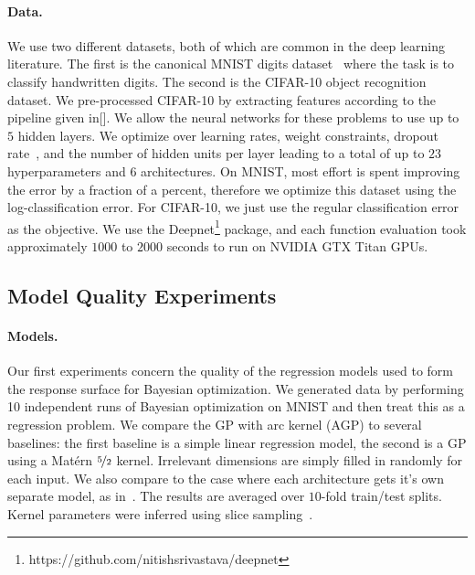 \documentclass{article}
\begin{document}
\paragraph{Data.} We use two different datasets, both of which are common in the deep learning literature. The first is the canonical MNIST digits dataset~\cite{lecun-1998a} where the task is to classify handwritten digits. The second is the CIFAR-10 object recognition dataset. We pre-processed CIFAR-10 by extracting features according to the pipeline given in[]. We allow the neural networks for these problems to use up to $5$ hidden layers. We optimize over learning rates, weight constraints, dropout rate~\cite{hinton2012improving}, and the number of hidden units per layer leading to a total of up to $23$ hyperparameters and $6$ architectures. On MNIST, most effort is spent improving the error by a fraction of a percent, therefore we optimize this dataset using the log-classification error. For CIFAR-10, we just use the regular classification error as the objective. We use the Deepnet\footnote{https://github.com/nitishsrivastava/deepnet} package, and each function evaluation took approximately $1000$ to $2000$ seconds to run on NVIDIA GTX Titan GPUs.

\subsection{Model Quality Experiments}   

\paragraph{Models.}
Our first experiments concern the quality of the regression models used to form the response surface for Bayesian optimization. We generated data by performing 10 independent runs of Bayesian optimization on MNIST and then treat this as a regression problem. We compare the GP with arc kernel (AGP) to several baselines: the first baseline is a simple linear regression model, the second is a GP using a Mat\'{e}rn $\nicefrac{5}{2}$ kernel. Irrelevant dimensions are simply filled in randomly for each input. We also compare to the case where each architecture gets it's own separate model, as in~\cite{bergstra2011algorithms}. The results are averaged over $10$-fold train/test splits. Kernel parameters were inferred using slice sampling~\cite{Murray-Adams-2010a}.
%
%
\end{document}
